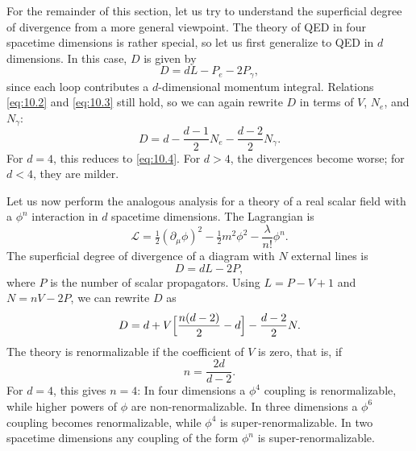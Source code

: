 For the remainder of this section, let us try to understand the superficial
degree of divergence from a more general viewpoint.  The theory of QED in four
spacetime dimensions is rather special, so let us first generalize to QED in
$d$ dimensions.  In this case, $D$ is given by
\begin{equation}
  D = dL - P_e - 2P_\gamma ,
  \label{eq:10.10}
\end{equation}
since each loop contributes a $d$-dimensional momentum integral.  Relations
\eqref{eq:10.2} and \eqref{eq:10.3} still hold, so we can again rewrite $D$ in
terms of $V$, $N_e$, and $N_\gamma$:
\begin{equation}
  D = d - \frac{d-1}{2}N_e - \frac{d-2}{2}N_\gamma .
\end{equation}
For $d = 4$, this reduces to \eqref{eq:10.4}.  For $d > 4$, the divergences
become worse; for $d < 4$, they are milder.

Let us now perform the analogous analysis for a theory of a real scalar field
with a $\phi^n$ interaction in $d$ spacetime dimensions.  The Lagrangian is
\begin{equation}
  \mathcal{L} = \tfrac{1}{2}(\partial_\mu\phi)^2 - \tfrac{1}{2}m^2\phi^2
    - \frac{\lambda}{n!}\phi^n .
  \label{eq:10.12}
\end{equation}
The superficial degree of divergence of a diagram with $N$ external lines is
\begin{equation}
  D = dL - 2P ,
  \label{eq:10.13}
\end{equation}
where $P$ is the number of scalar propagators.  Using
$L = P - V + 1$ and $N = nV - 2P$, we can rewrite $D$ as
\begin{equation}
  D = d + V\Bigl[ \frac{n(d-2)}{2} - d \Bigr] - \frac{d-2}{2}N .
  \label{eq:10.13b}
\end{equation}
The theory is renormalizable if the coefficient of $V$ is zero, that is, if
\begin{equation}
  n = \frac{2d}{d-2} .
\end{equation}
For $d = 4$, this gives $n = 4$: In four dimensions a $\phi^4$ coupling is
renormalizable, while higher powers of $\phi$ are non-renormalizable.  In three
dimensions a $\phi^6$ coupling becomes renormalizable, while $\phi^4$ is
super-renormalizable.  In two spacetime dimensions any coupling of the form
$\phi^n$ is super-renormalizable.

